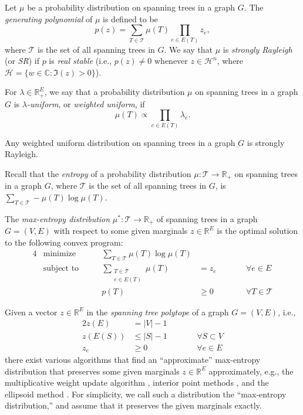 \documentclass[letterpaper, reqno,12pt]{article}
\newcommand{\RR}{\mathbb{R}}
\newcommand{\CC}{\mathbb{C}}
\begin{document}
\begin{definition}
  Let $\mu$ be a probability distribution on spanning trees in a graph $G$. The \emph{generating polynomial} of $\mu$ is defined to be
  $$ p(z) = \sum_{T \in \mathcal T} \mu(T) \prod_{e \in E(T)} z_e, $$
  where $\mathcal T$ is the set of all spanning trees in $G$. We say that $\mu$ is \emph{strongly Rayleigh} (or \emph{SR}) if $p$ is \emph{real stable} (i.e., $p(z) \neq 0$ whenever $z \in \mathcal H^n$, where $\mathcal H = \{ w \in \CC : \Im(z) > 0 \}$).
\end{definition}

\begin{definition}
  For $\lambda \in \RR_+^E$, we say that a probability distribution $\mu$ on spanning trees in a graph $G$ is \emph{$\lambda$-uniform}, or \emph{weighted uniform}, if
  $$ \mu(T) \propto \prod_{e \in E(T)} \lambda_e. $$
\end{definition}

\begin{theorem}
  Any weighted uniform distribution on spanning trees in a graph $G$ is strongly Rayleigh.
\end{theorem}

Recall that the \emph{entropy} of a probability distribution $\mu : \mathcal T \to \RR_+$ on spanning trees in a graph $G$, where $\mathcal T$ is the set of all spanning trees in $G$, is $\sum_{T \in \mathcal T} -\mu(T) \log \mu(T)$.

\begin{definition}
  The \emph{max-entropy distribution} $\mu^* : \mathcal T \to \RR_+$ of spanning trees in a graph $G = (V, E)$ with respect to some given marginals $z \in \RR^E$ is the optimal solution to the following convex program:
  \begin{alignat*}{4}
    & \text{minimize} \qquad & \sum_{T \in \mathcal T} \mu(T) \log \mu(T) \\
    & \text{subject to} \qquad & \sum_{\substack{T \in \mathcal T \\ e \in E(T)}} \mu(T) &= z_e && \qquad \forall e \in E \\
    & & p(T) &\geq 0 && \qquad \forall T \in \mathcal T
  \end{alignat*}
\end{definition}

Given a vector $z \in \RR^E$ in the \emph{spanning tree polytope} of a graph $G = (V, E)$, i.e.,
\begin{alignat*}{2}
  z(E) &= |V| - 1 \\
  z(E(S)) &\leq |S| - 1 && \qquad \forall S \subset V \\
  z_e &\geq 0 && \qquad \forall e \in E
\end{alignat*}
there exist various algorithms that find an ``approximate'' max-entropy distribution that preserves some given marginals $z \in \RR^E$ approximately, e.g., the multiplicative weight update algorithm \cite{asadpour2017log}, interior point methods \cite{sebHo2014shorter}, and the ellipsoid method \cite{asadpour2017log}. For simplicity, we call such a distribution the ``max-entropy distribution,'' and assume that it preserves the given marginals exactly.
\end{document}
